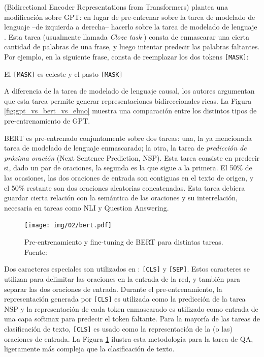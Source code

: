 \bert{} \cite{devlin2018bert} (Bidirectional Encoder Representations from Transformers) plantea una modificación sobre GPT: en lugar de pre-entrenar sobre la tarea de modelado de lenguaje  --de izquierda a derecha-- hacerlo sobre la tarea de modelado de lenguaje . Esta tarea (usualmente llamada \emph{Cloze task} \cite{taylor1953cloze}) consta de enmascarar una cierta cantidad de palabras de una frase, y luego intentar predecir las palabras faltantes. Por ejemplo, en la siguiente frase, consta de reemplazar los dos tokens \verb|[MASK]|:

\begin{center}
    El \verb|[MASK]| es celeste y el pasto \verb|[MASK]|
\end{center}


A diferencia de la tarea de modelado de lenguaje causal, los autores argumentan que esta tarea permite generar representaciones bidireccionales ricas. La Figura \ref{fig:gpt_vs_bert_vs_elmo} muestra una comparación entre los distintos tipos de pre-entrenamiento de GPT.

BERT es pre-entrenado conjuntamente sobre dos tareas: una, la ya mencionada tarea de modelado de lenguaje enmascarado; la otra, la tarea de \emph{predicción de próxima oración} (Next Sentence Prediction, NSP). Esta tarea consiste en predecir si, dado un par de oraciones, la segunda es la que sigue a la primera. El 50\% de las ocasiones, las dos oraciones de entrada son contiguas en el texto de origen, y el 50\% restante son dos oraciones aleatorias concatenadas. Esta tarea debiera guardar cierta relación con la semántica de las oraciones y su interrelación, necesaria en tareas como NLI y Question Answering.

\newcommand{\clstok}[0]{\texttt{[CLS]}}
\newcommand{\septok}[0]{\texttt{[SEP]}}

\begin{figure}[t]
    \centering
    \texttt{[image: img/02/bert.pdf]}
    \caption{Pre-entrenamiento y fine-tuning de BERT para distintas tareas. Fuente: \citet{devlin2018bert}}
    \label{fig:bert_pretraining_and_finetuning}
\end{figure}

Dos caracteres especiales son utilizados en \bert{}: \clstok{} y \septok{}. Estos caracteres se utilizan para delimitar las oraciones en la entrada de la red, y también para separar las dos oraciones de entrada. Durante el pre-entrenamiento, la representación generada por \clstok{} es utilizada como la predicción de la tarea NSP y la representación de cada token enmascarado es utilizado como entrada de una capa softmax para predecir el token faltante. Para la mayoría de las tareas de clasificación de texto, \clstok{} es usado como la representación de la (o las) oraciones de entrada. La Figura \ref{fig:bert_pretraining_and_finetuning} ilustra esta metodología para la tarea de QA, ligeramente más compleja que la clasificación de texto.


